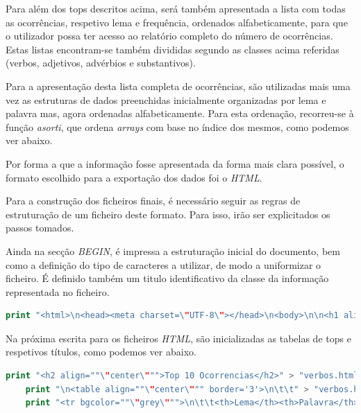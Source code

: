 \documentclass[a4paper]{article}
\begin{document}
\par Para além dos tops descritos acima, será também apresentada a lista com todas as ocorrências, respetivo lema e frequência, ordenados alfabeticamente, para que o utilizador possa ter acesso ao relatório completo do número de ocorrências. Estas listas encontram-se também divididas segundo as classes acima referidas (verbos, adjetivos, advérbios e substantivos).
\par Para a apresentação desta lista completa de ocorrências, são utilizadas mais uma vez as estruturas de dados preenchidas inicialmente organizadas por lema e palavra mas, agora ordenadas alfabeticamente. Para esta ordenação, recorreu-se à função \emph{asorti}, que ordena \textit{arrays} com base no índice dos mesmos, como podemos ver abaixo.

\par Por forma a que a informação fosse apresentada da forma mais clara possível, o formato escolhido para a exportação dos dados foi o \emph{HTML}.
\par Para a construção dos ficheiros finais, é necessário seguir as regras de estruturação de um ficheiro deste formato. Para isso, irão ser explicitados os passos tomados.
\par Ainda na secção \emph{BEGIN}, é impressa a estruturação inicial do documento, bem como a definição do tipo de caracteres a utilizar, de modo a uniformizar o ficheiro. É definido também um titulo identificativo da classe da informação representada no ficheiro.

\begin{lstlisting}[language=Awk, caption=Inicialização da estruturação dos documentos \emph{HTML}.]
	 print "<html>\n<head><meta charset=\"UTF-8\"></head>\n<body>\n\n<h1 align=""\"center\""">Verbos</h1>" > "verbos.html"
\end{lstlisting}

\par Na próxima escrita para os ficheiros \emph{HTML}, são inicializadas as tabelas de tops e respetivos títulos, como podemos ver abaixo.

\begin{lstlisting}[language=Awk, caption=Inicialização da tabela e respetivo título.]
	print "<h2 align=""\"center\""">Top 10 Ocorrencias</h2>" > "verbos.html";
    print "\n<table align=""\"center\""" border='3'>\n\t\t" > "verbos.html"; 
    print "<tr bgcolor=""\"grey\""">\n\t\t<th>Lema</th><th>Palavra</th><th>Ocorrencias</th>\n\t</tr>" > "verbos.html"
\end{lstlisting}
\end{document}

